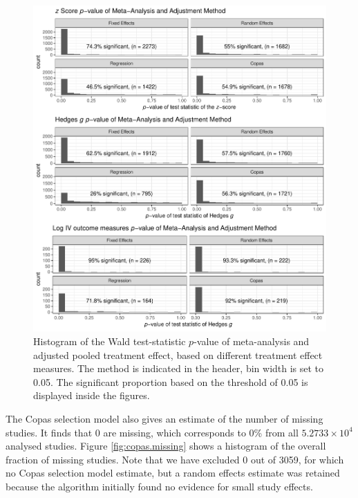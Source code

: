 \documentclass[11pt,a4paper,twoside]{book}\usepackage[]{graphicx}\usepackage[]{color}
\newenvironment{knitrout}{}{} %
\begin{document}
\begin{figure}
\begin{knitrout}
\color{fgcolor}

{\centering \includegraphics[width=\textwidth-3cm]{figure/ch03_figunnamed-chunk-19-1} 

}



\end{knitrout}
\caption{Histogram of the Wald test-statistic $p$-value of meta-analysis and adjusted pooled treatment effect, based on different treatment effect measures. The method is indicated in the header, bin width is set to 0.05. The significant proportion based on the threshold of 0.05 is displayed inside the figures.}
\label{fig:adjustment.stat}
\end{figure}

The Copas selection model also gives an estimate of the number of missing studies. It finds that 0 are missing, which corresponds to 0\% from all \ensuremath{5.2733\times 10^{4}} analysed studies. Figure \ref{fig:copas.missing} shows a histogram of the overall fraction of missing studies. Note that we have excluded 0 out of 3059, for which no Copas selection model estimate, but a random effects estimate was retained because the algorithm initially found no evidence for small study effects.
\end{document}
